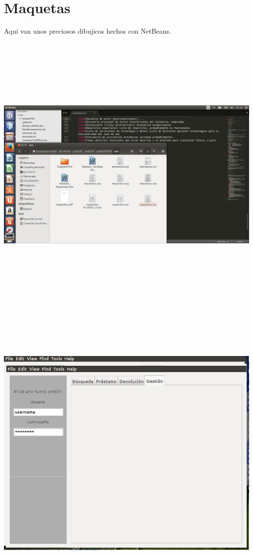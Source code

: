 \documentclass[a4paper, 12pt]{article}
\begin{document}
\section{Maquetas}
Aqui van unos preciosos dibujicos hechos con NetBeans.\\
\includegraphics[width=15cm, height=15cm, keepaspectratio]{ZZZ.jpg}
\includegraphics[width=15cm, height=15cm, keepaspectratio]{beta1.jpg}
\end{document}
